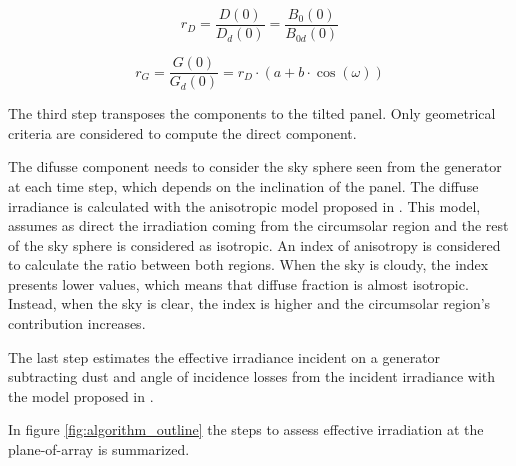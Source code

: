 \begin{equation}\label{ratioB0}
r_{D}=\frac{D(0)}{D_d(0)}=\frac{B_0(0)}{B_{0d}(0)}
\end{equation}


\begin{equation}\label{ratioG0}
r_G=\frac{G(0)}{G_d(0)}=r_D\cdot(a+b\cdot\cos(\omega))
\end{equation}


The third step transposes the components to the tilted panel. Only geometrical criteria are considered to compute the direct component.

The difusse component needs to consider the sky sphere seen from the generator at each time step, which depends on the inclination of the panel. The diffuse irradiance is calculated with the anisotropic model proposed in \cite{hay1985estimating}. This model, assumes as direct the irradiation coming from the circumsolar region and the rest of the sky sphere is considered as isotropic. An index of anisotropy is considered to calculate the ratio between both regions. When the sky is cloudy, the index presents lower values, which means that diffuse fraction is almost isotropic. Instead, when the sky is clear, the index is higher and the circumsolar region's contribution increases.

The last step estimates the effective irradiance incident on a generator subtracting dust and angle of incidence losses from the incident irradiance with the model proposed in \cite{Martin2001}.

In figure \ref{fig:algorithm_outline} the steps to assess effective irradiation at the plane-of-array is summarized.


